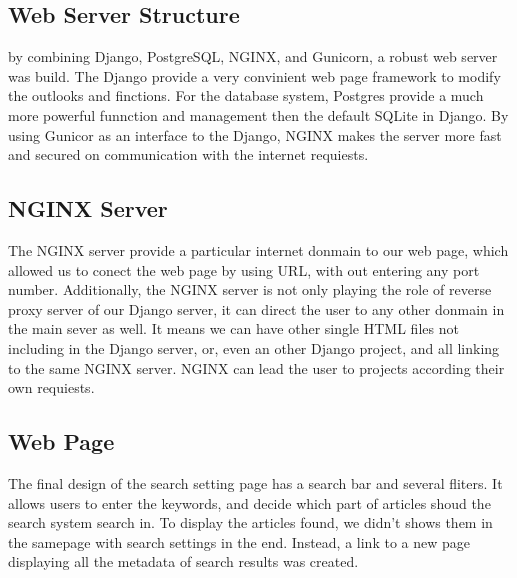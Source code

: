 \subsection{Web Server Structure}
by combining Django, PostgreSQL, NGINX, and Gunicorn, a robust web server was build.
The Django provide a very convinient web page framework to modify the outlooks and finctions. 
For the database system, Postgres provide a much more powerful funnction and management then the default SQLite in Django.
By using Gunicor as an interface to the Django, NGINX makes the server more  fast and secured on communication with the internet requiests.

\subsection{NGINX Server}
The NGINX server provide a particular internet donmain to our web page,
which allowed us to conect the web page by using URL,
with out entering any port number. Additionally,
the NGINX server is not only playing the role of reverse proxy server of our Django server,
it can direct the user to any other donmain in the main sever as well.
It means we can have other single HTML files not including in the Django server, or,
even an other Django project, and all linking to the same NGINX server.
NGINX can lead the user to projects according their own requiests. 

\subsection{Web Page}
The final design of the search setting page has a search bar and several fliters.
It allows users to enter the keywords, and decide which part of articles shoud the search system search in.
To display the articles found, we didn't shows them in the samepage with search settings in the end. Instead, a link to a new page displaying all the metadata of search results was created.
